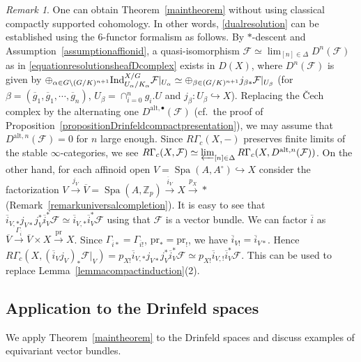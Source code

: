 \documentclass[a4paper,10pt]{amsart}
\theoremstyle{remark}
\newtheorem{remark}[theorem]{Remark}
\theoremstyle{definition}
\theoremstyle{plain}
\numberwithin{equation}{section}
\newcommand{\bbZ}{{\mathbb Z}}
\newcommand{\calF}{{\mathcal F}}
\newcommand{\ovg}{{\overline g}}
\newcommand{\ovi}{{\overline i}}
\newcommand{\Ind}{{\rm Ind}}
\DeclareMathOperator{\Spa}{Spa}
\begin{document}
\begin{remark}\label{remarkalternateproof}
	One can obtain Theorem~\ref{maintheorem} without using classical compactly supported cohomology. In other words, \eqref{dualresolution} can be established using the $6$-functor formalism as follows. By $*$-descent and Assumption~\ref{assumptionaffionid}, a quasi-isomorphism $\calF\simeq \lim_{[n]\in\Delta}D^{n}(\calF)$ as in \eqref{equationresolutionsheafDcomplex} exists in $D(X)$, where $D^{n}(\calF)$ is given by $\oplus_{\alpha \in G\backslash (G/K)^{n+1}} \Ind^{X/G}_{U_{\alpha}/K_{\alpha}} \calF|_{U_\alpha}\simeq \oplus_{\beta \in (G/K)^{n+1}} j_{\beta*}\calF|_{U_\beta}$ (for $\beta=(\ovg_1,\ovg_1,\cdots,\ovg_n)$, $U_{\beta}=\cap_{i=0}^n g_{i}.U$ and $j_{\beta}:U_{\beta}\hookrightarrow X$). Replacing the \v{C}ech complex by the alternating one $D^{\mathrm{alt},\bullet}(\calF)$ \cite[\href{https://stacks.math.columbia.edu/tag/01FG}{Tag 01FG}]{stacks-project} (cf.\ the proof of Proposition~\ref{propositionDrinfeldcompactpresentation}), we may assume that $D^{\mathrm{alt},n}(\calF)=0$ for $n$ large enough. Since $R\Gamma_c(X,-)$ preserves finite limits of the stable $\infty$-categories, we see $R\Gamma_c(X,\calF)\simeq\varprojlim_{[n]\in\Delta}R\Gamma_c(X,D^{\mathrm{alt},n}(\calF))$. On the other hand, for each affinoid open $V=\Spa(A,A^{\circ})\hookrightarrow X$ consider the factorization $V\stackrel{j_V}{\rightarrow}\overline{V}=\Spa(A,\bbZ_p)\stackrel{\ovi_V}{\rightarrow}X\xrightarrow{p_X}*$ (Remark~\ref{remarkuniversalcompletion}). It is easy to see that $\ovi_{V,*}j_{V*}j_V^*\ovi_V^*\calF\simeq \ovi_{V,*}\ovi_V^*\calF$ using that $\calF$ is a vector bundle. We can factor $\ovi$ as $\overline{V}\stackrel{\Gamma_{\ovi}}\longrightarrow \overline{V}\times X\stackrel{\mathrm{pr}}\longrightarrow X$. Since $\Gamma_{\ovi*}=\Gamma_{\ovi!}$, $\mathrm{pr}_*=\mathrm{pr}_!$, we have $\ovi_{V!}=\ovi_{V*}$. Hence $R\Gamma_c(X, (\ovi_Vj_V)_*\calF|_V)=p_{X!}\ovi_{V,*}j_{V*}j_V^*\ovi_V^*\calF\simeq p_{X!}\ovi_{V,!}\ovi_V^*\calF$. This can be used to replace Lemma~\ref{lemmacompactinduction}(2). 
\end{remark}

\subsection{Application to the Drinfeld spaces}\label{subsec:Drinfeldspaces}
We apply Theorem~\ref{maintheorem} to the Drinfeld spaces and discuss examples of equivariant vector bundles. 
\end{document}
